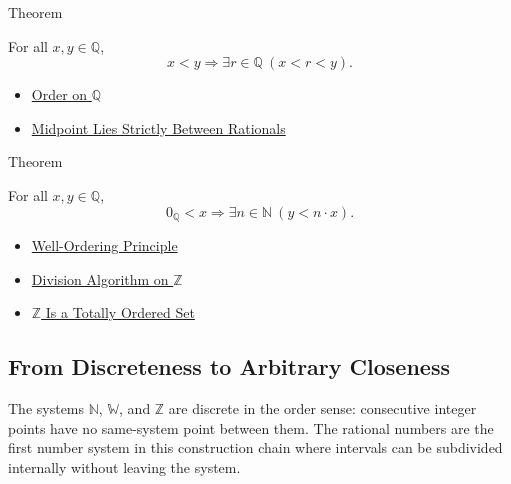 \begin{theorembox}{Theorem}
\begin{theorem}
\label{thm:density-of-q}
For all $x,y\in\mathbb{Q}$,
\[
x<y
\Longrightarrow
\exists r\in\mathbb{Q}\ (x<r<y).
\]
\end{theorem}
\end{theorembox}

\begin{dependencies}
\begin{itemize}
  \item \hyperref[def:order-on-q]{Order on $\mathbb{Q}$}
  \item \hyperref[lem:midpoint-between-q]{Midpoint Lies Strictly Between Rationals}
\end{itemize}
\end{dependencies}

\begin{theorembox}{Theorem}
\begin{theorem}
\label{thm:archimedean-property-of-q}
For all $x,y\in\mathbb{Q}$,
\[
0_{\mathbb{Q}}<x
\Longrightarrow
\exists n\in\mathbb{N}\ (y<n\cdot x).
\]
\end{theorem}
\end{theorembox}

\begin{dependencies}
\begin{itemize}
  \item \hyperref[thm:well-ordering-principle]{Well-Ordering Principle}
  \item \hyperref[thm:division-algorithm-on-z]{Division Algorithm on $\mathbb{Z}$}
  \item \hyperref[thm:z-totally-ordered-set]{$\mathbb{Z}$ Is a Totally Ordered Set}
\end{itemize}
\end{dependencies}

\subsection*{From Discreteness to Arbitrary Closeness}

\begin{remark}
\label{rem:discrete-systems-before-q}
The systems $\mathbb{N}$, $\mathbb{W}$, and $\mathbb{Z}$ are discrete in the
order sense: consecutive integer points have no same-system point between
them. The rational numbers are the first number system in this construction
chain where intervals can be subdivided internally without leaving the system.
\end{remark}


